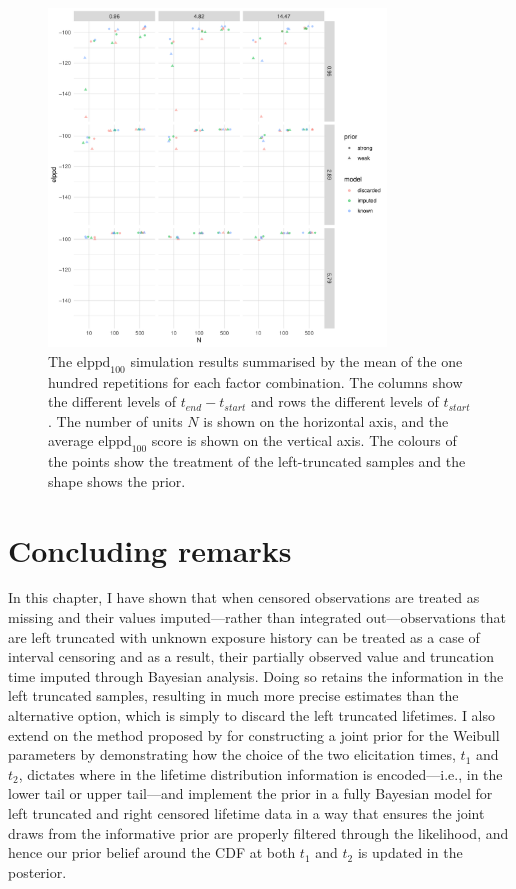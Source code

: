 \begin{figure}
    \centering
    \includegraphics[width=0.8\textwidth]{./figures/ch-2/sim-results-elppd.pdf}
    \caption{The $\text{elppd}_{100}$ simulation results summarised by the mean of the one hundred repetitions for each factor combination. The columns show the different levels of $t_{end} - t_{start}$ and rows the different levels of $t_{start}$. The number of units $N$ is shown on the horizontal axis, and the average $\text{elppd}_{100}$ score is shown on the vertical axis. The colours of the points show the treatment of the left-truncated samples and the shape shows the prior.}
    \label{fig:sim-study-elppd}
\end{figure}

\section{Concluding remarks} \label{sec:weibull-conclusion}

In this chapter, I have shown that when censored observations are treated as missing and their values imputed---rather than integrated out---observations that are left truncated with unknown exposure history can be treated as a case of interval censoring and as a result, their partially observed value and truncation time imputed through Bayesian analysis. Doing so retains the information in the left truncated samples, resulting in much more precise estimates than the alternative option, which is simply to discard the left truncated lifetimes. I also extend on the method proposed by \citet{kaminskiy2005} for constructing a joint prior for the Weibull parameters by demonstrating how the choice of the two elicitation times, $t_1$ and $t_2$, dictates where in the lifetime distribution information is encoded---i.e., in the lower tail or upper tail---and implement the prior in a fully Bayesian model for left truncated and right censored lifetime data in a way that ensures the joint draws from the informative prior are properly filtered through the likelihood, and hence our prior belief around the CDF at both $t_1$ and $t_2$ is updated in the posterior.


